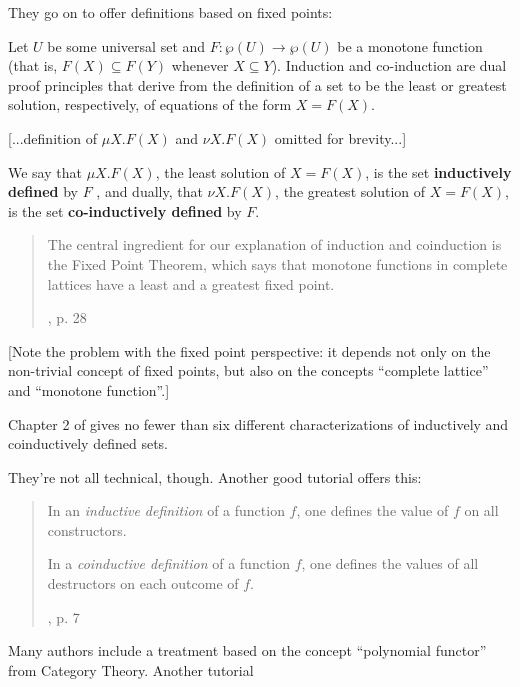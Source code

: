 \vspace{1ex}

They go on to offer definitions based on fixed points:

\begin{displayquote}
  Let \(U\) be some universal set and \(F :
  \wp(U)\rightarrow\wp(U)\) be a monotone function (that is,
  \(F(X)\subseteq F(Y)\) whenever \(X\subseteq Y\)). Induction and
  co-induction are dual proof principles that derive from the
  definition of a set to be the least or greatest solution,
  respectively, of equations of the form \(X = F (X)\).
  \vspace{1ex}

  [...definition of \(\mu X.F(X)\) and \(\nu X.F(X)\) omitted for brevity...]
  \vspace{1ex}

  We say that \(\mu X.F(X)\), the least solution of \(X = F(X)\), is
  the set \textbf{inductively defined} by \(F\) , and dually, that
  \(\nu X.F(X)\), the greatest solution of \(X = F(X)\), is the set
  \textbf{co-inductively defined} by \(F\).
\end{displayquote}

\vspace{2ex}

\blockquote[\cite{sangiorgi2011introduction}, p. 28]{The central ingredient for our explanation of induction and coinduction is the Fixed Point Theorem, which says that monotone functions in complete lattices have a least and a greatest fixed point.}

[Note the problem with the fixed point perspective: it depends not
  only on the non-trivial concept of fixed points, but also on the
  concepts ``complete lattice'' and ``monotone function''.]

Chapter 2 of  gives no fewer than
six different characterizations of inductively and coinductively
defined sets.

They're not all technical, though. Another good tutorial offers this:

\blockquote[\cite{Jacobs1997ATO}, p. 7]{In an \textit{inductive definition} of a function \(f\), one defines the value of \(f\) on all constructors.

In a \textit{coinductive definition} of a function \(f\), one defines
  the values of all destructors on each outcome of \(f\).}

Many authors include a treatment based on the concept ``polynomial
functor'' from Category Theory. Another tutorial

